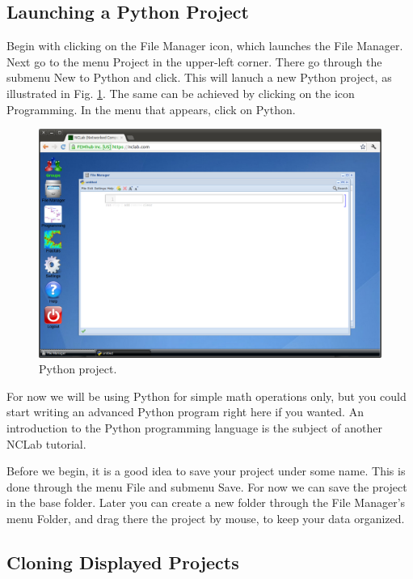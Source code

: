 \documentclass[article,A4,12pt]{llncs}
\begin{document}
\subsection{Launching a Python Project}

Begin with clicking on the File Manager icon, which launches the File 
Manager. Next go to the menu Project in the upper-left corner. There go 
through the submenu New to Python and click. This will lanuch a new Python 
project, as illustrated in Fig. \ref{fig:python}. The same can be achieved
by clicking on the icon Programming. In the menu that appears, click on 
Python. 

\newpage

\begin{figure}[!ht]
\begin{center}
\includegraphics[width=\textwidth]{img/python.png}
\end{center}
\caption{Python project.}
\label{fig:python}
\end{figure}
\noindent
For now we will be using Python for simple math operations only,
but you could start writing an advanced Python program right 
here if you wanted. An introduction to the Python programming 
language is the subject of another NCLab tutorial.

Before we begin, it is a good idea to save your project under some 
name. This is done through the menu File and submenu Save. For 
now we can save the project in the base folder. Later you can create 
a new folder through the File Manager's menu Folder, and drag there
the project by mouse, to keep your data organized.

\subsection{Cloning Displayed Projects}
\end{document}
